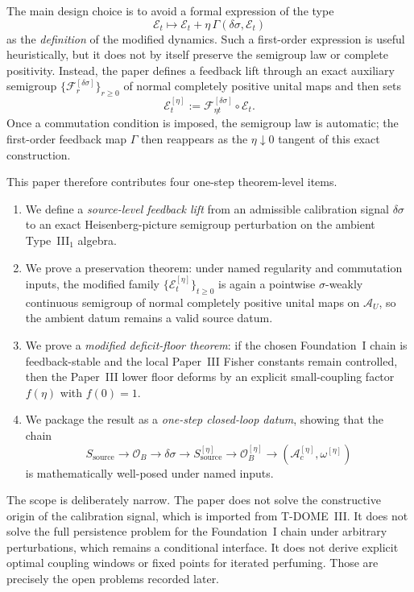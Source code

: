 \documentclass[12pt]{article}
\theoremstyle{definition}
\theoremstyle{remark}
\begin{document}
The main design choice is to avoid a formal expression of the type
\[
\mathcal E_t \mapsto \mathcal E_t + \eta\,\Gamma(\delta\sigma,\mathcal E_t)
\]
as the \emph{definition} of the modified dynamics. Such a first-order
expression is useful heuristically, but it does not by itself preserve
the semigroup law or complete positivity. Instead, the paper defines a
feedback lift through an exact auxiliary semigroup
\(\{\mathscr F_r^{[\delta\sigma]}\}_{r\ge 0}\) of normal completely
positive unital maps and then sets
\[
\mathcal E_t^{[\eta]}
:=
\mathscr F_{\eta t}^{[\delta\sigma]}\circ\mathcal E_t.
\]
Once a commutation condition is imposed, the semigroup law is automatic;
the first-order feedback map \(\Gamma\) then reappears as the
\(\eta\downarrow 0\) tangent of this exact construction.

This paper therefore contributes four one-step theorem-level items.
\begin{enumerate}
\item We define a \emph{source-level feedback lift} from an admissible
  calibration signal \(\delta\sigma\) to an exact Heisenberg-picture
  semigroup perturbation on the ambient Type~III\(_1\) algebra.
\item We prove a preservation theorem: under named regularity and
  commutation inputs, the modified family
  \(\{\mathcal E_t^{[\eta]}\}_{t\ge0}\) is again a pointwise
  \(\sigma\)-weakly continuous semigroup of normal completely positive
  unital maps on \(\mathcal A_U\), so the ambient datum remains a valid
  source datum.
\item We prove a \emph{modified deficit-floor theorem}: if the chosen
  Foundation~I chain is feedback-stable and the local Paper~III Fisher
  constants remain controlled, then the Paper~III lower floor deforms by
  an explicit small-coupling factor \(f(\eta)\) with \(f(0)=1\).
\item We package the result as a \emph{one-step closed-loop datum},
  showing that the chain
  \[
  S_{\mathrm{source}}
  \to
  \mathcal O_B
  \to
  \delta\sigma
  \to
  S_{\mathrm{source}}^{[\eta]}
  \to
  \mathcal O_B^{[\eta]}
  \to
  (\mathcal A_c^{[\eta]},\omega^{[\eta]})
  \]
  is mathematically well-posed under named inputs.
\end{enumerate}

The scope is deliberately narrow. The paper does not solve the
constructive origin of the calibration signal, which is imported from
T-DOME~III. It does not solve the full persistence problem for the
Foundation~I chain under arbitrary perturbations, which remains a
conditional interface. It does not derive explicit optimal coupling
windows or fixed points for iterated perfuming. Those are precisely the
open problems recorded later.
\end{document}
